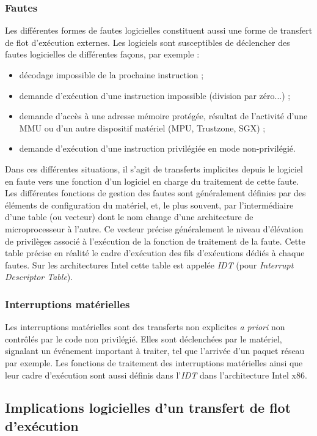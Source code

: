 			\subsubsection{Fautes}
\label{sec:faults}
Les différentes formes de fautes logicielles constituent aussi une forme de transfert de flot d'exécution externes. Les logiciels sont susceptibles de déclencher des fautes logicielles de différentes façons, par exemple :
\begin{itemize}
  \item décodage impossible de la prochaine instruction ;
  \item demande d'exécution d'une instruction impossible (division par zéro...) ; 
  \item demande d'accès à une adresse mémoire protégée, résultat de l'activité d'une MMU ou d'un autre dispositif matériel (MPU, Trustzone, SGX) ;  
  \item demande d'exécution d'une instruction privilégiée en mode non-privilégié.
\end{itemize}
Dans ces différentes situations, il s'agit de transferts implicites depuis le logiciel en faute vers une fonction d'un logiciel en charge du traitement de cette faute. Les différentes fonctions de gestion des fautes sont généralement définies par des éléments de configuration du matériel, et, le plus souvent, par l'intermédiaire d'une table (ou vecteur) dont le nom change d'une architecture de microprocesseur à l'autre. Ce vecteur précise généralement le niveau d'élévation de privilèges associé à l'exécution de la fonction de traitement de la faute. Cette table précise en réalité le cadre d'exécution des fils d'exécutions dédiés à chaque fautes. Sur les architectures Intel cette table est appelée \emph{IDT} (pour \emph{Interrupt Descriptor Table}).
\label{IDT}

			\subsubsection{Interruptions matérielles}
			Les interruptions matérielles sont des transferts non explicites \textit{a priori} non contrôlés par le code non privilégié. Elles sont déclenchées par le matériel, signalant un événement important à traiter, tel que l'arrivée d'un paquet réseau par exemple. Les fonctions de traitement des interruptions matérielles ainsi que leur cadre d'exécution sont aussi définis dans l'\emph{IDT} dans l'architecture Intel x86.

		\subsection{Implications logicielles d'un transfert de flot d'exécution}


